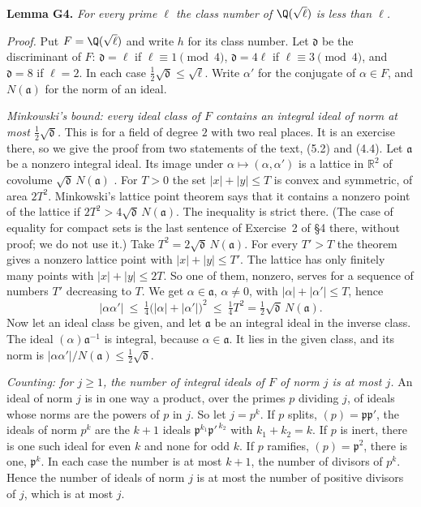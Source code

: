 \documentclass[11pt,letterpaper]{article}
\begin{document}
\textbf{Lemma G4.} \emph{For every prime $\ell$ the class number of $\Q(\sqrt\ell)$ is less than $\ell$.}

\emph{Proof.} Put $F=\Q(\sqrt\ell)$ and write $h$ for its class number. Let $\mathfrak d$ be the
discriminant of $F$: $\mathfrak d=\ell$ if $\ell\equiv1\pmod4$, $\mathfrak d=4\ell$ if $\ell\equiv3\pmod4$,
and $\mathfrak d=8$ if $\ell=2$. In each case $\tfrac12\sqrt{\mathfrak d}\le\sqrt\ell$. Write $\alpha'$ for
the conjugate of $\alpha\in F$, and $N(\mathfrak a)$ for the norm of an ideal.

\emph{Minkowski's bound: every ideal class of $F$ contains an integral ideal of norm at most
$\tfrac12\sqrt{\mathfrak d}$.} This is \cite[Ch.~I, \S6, Exercise~3]{Neu99} for a field of degree $2$ with two
real places. It is an exercise there, so we give the proof from two statements of the text, (5.2) and
(4.4). Let
$\mathfrak a$ be a nonzero integral ideal. Its image under $\alpha\mapsto(\alpha,\alpha')$ is a lattice in
$\mathbb R^2$ of covolume $\sqrt{\mathfrak d}\,N(\mathfrak a)$ \cite[Ch.~I, (5.2)]{Neu99}. For $T>0$ the set
$|x|+|y|\le T$ is convex and symmetric, of area $2T^2$. Minkowski's lattice point theorem
\cite[Ch.~I, (4.4)]{Neu99} says that it contains a nonzero point of the lattice if
$2T^2>4\sqrt{\mathfrak d}\,N(\mathfrak a)$. The inequality is strict there. (The case of equality for
compact sets is the last sentence of Exercise~2 of \S4 there, without proof; we do not use it.) Take
$T^2=2\sqrt{\mathfrak d}\,N(\mathfrak a)$. For every $T'>T$ the theorem gives a nonzero lattice point with
$|x|+|y|\le T'$. The lattice has only finitely many points with $|x|+|y|\le 2T$. So one of them, nonzero,
serves for a sequence of numbers $T'$ decreasing to $T$. We get
$\alpha\in\mathfrak a$, $\alpha\ne0$, with $|\alpha|+|\alpha'|\le T$, hence
\begin{equation}\label{D:343}
 |\alpha\alpha'|\ \le\ \tfrac14\big(|\alpha|+|\alpha'|\big)^2\ \le\ \tfrac14T^2=\tfrac12\sqrt{\mathfrak d}\,N(\mathfrak a).
\end{equation}
Now let an ideal class be given, and let $\mathfrak a$ be an integral ideal in the inverse class. The ideal
$(\alpha)\mathfrak a^{-1}$ is integral, because $\alpha\in\mathfrak a$. It lies in the given class, and its
norm is $|\alpha\alpha'|/N(\mathfrak a)\le\tfrac12\sqrt{\mathfrak d}$.

\emph{Counting: for $j\ge1$, the number of integral ideals of $F$ of norm $j$ is at most $j$.} An ideal of norm
$j$ is in one way a product, over the primes $p$ dividing $j$, of ideals whose norms are the powers of $p$
in $j$. So let $j=p^{k}$. If $p$ splits, $(p)=\mathfrak p\mathfrak p'$, the ideals of norm $p^k$ are the
$k+1$ ideals $\mathfrak p^{k_1}\mathfrak p'^{\,k_2}$ with $k_1+k_2=k$. If $p$ is inert, there is one such ideal
for even $k$ and none for odd $k$. If $p$ ramifies, $(p)=\mathfrak p^2$, there is one, $\mathfrak p^{k}$. In
each case the number is at most $k+1$, the number of divisors of $p^k$. Hence the number of ideals of norm
$j$ is at most the number of positive divisors of $j$, which is at most $j$.
\end{document}
